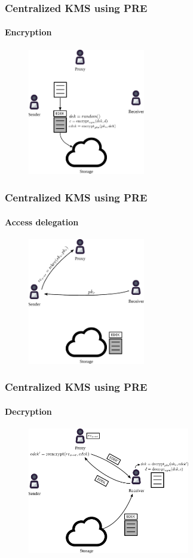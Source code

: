 \documentclass[xetex,mathsans,sans,aspectratio=169]{beamer}
\begin{document}
    \begin{frame}
        \frametitle{Centralized KMS using PRE}
        \framesubtitle{Encryption}
        \begin{figure}
            \centering
            \includegraphics[height=5.5cm]{pdf/encrypt.pdf}
        \end{figure}
    \end{frame}

    \begin{frame}
        \frametitle{Centralized KMS using PRE}
        \framesubtitle{Access delegation}
        \begin{figure}
            \centering
            \includegraphics[height=5.5cm]{pdf/delegate.pdf}
        \end{figure}
    \end{frame}

    \begin{frame}
        \frametitle{Centralized KMS using PRE}
        \framesubtitle{Decryption}
        \begin{figure}
            \centering
            \includegraphics[height=5.5cm]{pdf/decrypt.pdf}
        \end{figure}
    \end{frame}
\end{document}
